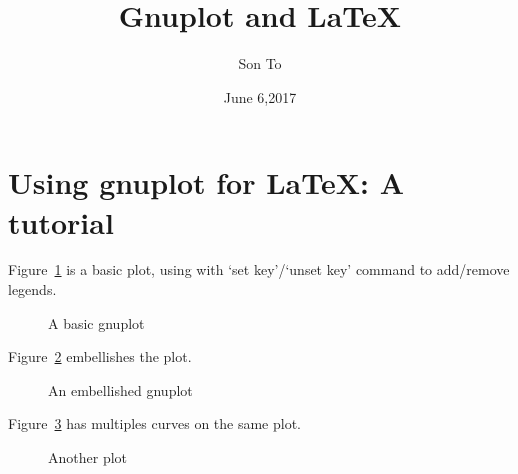 \documentclass[a4paper,11pt]{article}
\title{Gnuplot and LaTeX}
\author{Son To}
\date{June 6,2017}
\begin{document}
\maketitle
\tableofcontents
\newpage
\section{Using gnuplot for LaTeX: A tutorial}
Figure~\ref{fig:eg1} is a basic plot, using with `set key'/`unset key'
command to add/remove legends.
  \begin{figure}
    \begin{center}
      
      \caption{A basic gnuplot}
      \label{fig:eg1}
    \end{center}
  \end{figure}

Figure~\ref{fig:eg2} embellishes the plot.
\begin{figure}
  \begin{center}
    
    \caption{An embellished gnuplot}
    \label{fig:eg2}
  \end{center}
\end{figure}

Figure~\ref{fig:eg3} has multiples curves on the same plot.
\begin{figure}
  \begin{center}
    
    \caption{Another plot}
    \label{fig:eg3}
  \end{center}
\end{figure}
\end{document}
